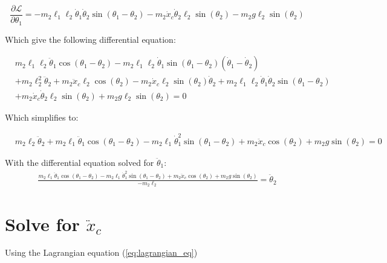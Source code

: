 \documentclass[10pt]{article}
\begin{document}
    
    \begin{equation} \label{eq: lagrange Step3}
        \frac{\partial \mathcal{L}}{\partial\theta_1} =
        -m_2 \ell_1 \ell_2 \dot \theta_1 \dot\theta_2\sin(\theta_1-\theta_2)
        -m_2\dot x_c \dot \theta_2 \ell_2 \sin(\theta_2)
        -m_2g\ell_2\sin(\theta_2)
        \end{equation}

    Which give the following differential equation:

    \begin{equation}
        \begin{aligned}
                &m_2 \ell_1 \ell_2 \ddot \theta_1 \cos(\theta_1 - \theta_2) - m_2 \ell_1 \ell_2 \dot \theta_1 \sin(\theta_1 - \theta_2)(\dot \theta_1 - \dot \theta_2)\\
                &+m_2\ell_2^2 \ddot \theta_2 + m_2 \ddot x_c \ell_2 \cos(\theta_2) - m_2 \dot x_c \ell_2 \sin(\theta_2)\dot\theta_2 + m_2 \ell_1 \ell_2 \dot \theta_1 \dot\theta_2\sin(\theta_1 - \theta_2)\\
                &+m_2\dot x_c \dot \theta_2 \ell_2 \sin(\theta_2)+m_2g\ell_2\sin(\theta_2) = 0
        \end{aligned}
    \end{equation}   


    Which simplifies to:

    \begin{equation}
        \begin{aligned}
            &m_2\ell_2 \ddot \theta_2 + m_2 \ell_1  \ddot \theta_1 \cos(\theta_1 - \theta_2) - m_2 \ell_1\dot \theta_1^2 \sin(\theta_1 - \theta_2)+ m_2 \ddot x_c  \cos(\theta_2) +m_2g\sin(\theta_2) =0
        \end{aligned}
    \end{equation}  

    With the differential equation solved for $\ddot \theta_1$:
    \begin{equation}
        \begin{aligned}
            \frac{m_2 \ell_1  \ddot \theta_1 \cos(\theta_1 - \theta_2) - m_2 \ell_1\dot \theta_1^2 \sin(\theta_1 - \theta_2)+ m_2 \ddot x_c  \cos(\theta_2) +m_2g\sin(\theta_2)}{-m_2 \ell_2} = \ddot \theta_2
        \end{aligned}
    \end{equation}  

    \section{Solve for $\ddot x_c$}
    Using the Lagrangian equation (\ref{eq:lagrangian_eq})
\end{document}
